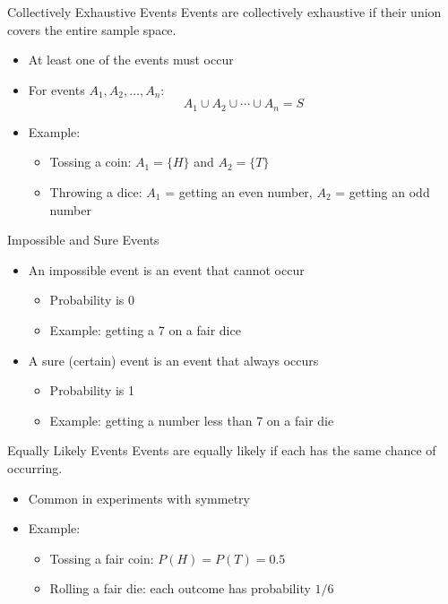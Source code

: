 \documentclass[12pt, aspectratio=169]{beamer}
\begin{document}
	\begin{frame}{Collectively Exhaustive Events}
		Events are collectively exhaustive if their union covers the entire sample space.
		\begin{itemize}
			\item At least one of the events must occur
			\item For events $A_1, A_2, \dots, A_n$:
			\[
				A_1 \cup A_2 \cup \cdots \cup A_n = S
			\]
			\item Example:
			\begin{itemize}
				\item Tossing a coin: $A_1 = \{H\}$ and $A_2 = \{T\}$
				\item Throwing a dice: $A_1$ = getting an even number, $A_2$ = getting an odd number
			\end{itemize}
		\end{itemize}
	\end{frame}


	\begin{frame}{Impossible and Sure Events}
		\begin{itemize}
			\item An impossible event is an event that cannot occur
			\begin{itemize}
				\item Probability is 0
				\item Example: getting a 7 on a fair dice
			\end{itemize}
			\item A sure (certain) event is an event that always occurs
			\begin{itemize}
				\item Probability is 1
				\item Example: getting a number less than 7 on a fair die
			\end{itemize}
		\end{itemize}
	\end{frame}


	\begin{frame}{Equally Likely Events}
		Events are equally likely if each has the same chance of occurring.
		\begin{itemize}
			\item Common in experiments with symmetry
			\item Example:
			\begin{itemize}
				\item Tossing a fair coin: $P(H) = P(T) = 0.5$
				\item Rolling a fair die: each outcome has probability $1/6$
			\end{itemize}
		\end{itemize}
	\end{frame}
\end{document}
